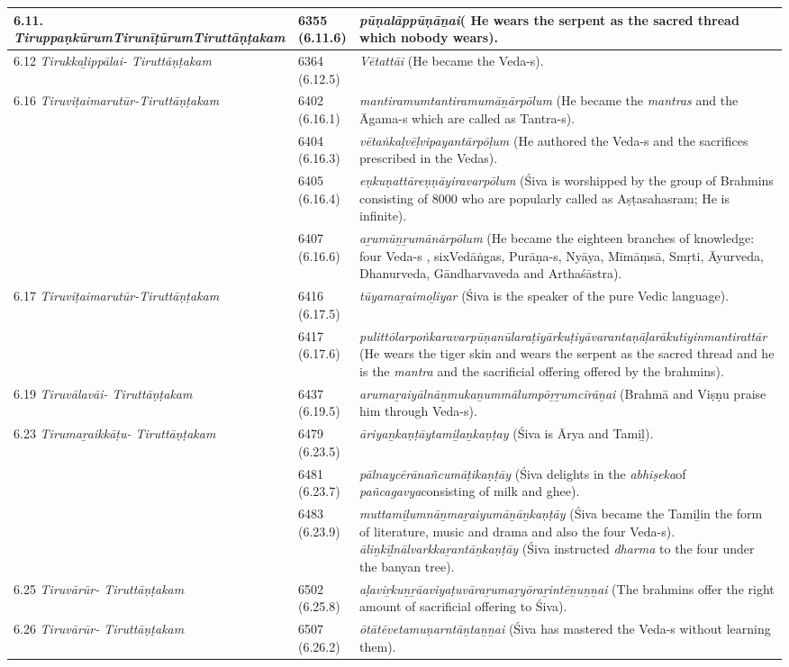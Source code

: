 \begin{longtable}{|m{2.7cm}|m{2.7cm}|>{\raggedright}m{3.1cm}|}
\hline
6.11. \textit{Tiruppaṇkūrum\-Tirunīṭūrum\-Tiruttāṇṭakam} & 6355 (6.11.6) & \textit{pūṇalāppūṇāṉai}( He wears the serpent as the sacred thread which nobody wears). \tabularnewline
\hline
6.12 \textit{Tirukkaḻippālai- Tiruttāṇṭakam} & 6364 (6.12.5) & \textit{Vētattāi} (He became the Veda-s). \tabularnewline
\hline
6.16 \textit{Tiruviṭaimarutūr-Tiruttāṇṭakam} & 6402 (6.16.1) & \textit{mantiramumtantira\-mumāṉārpōlum}  (He became the \textit{mantras }and the Āgama-s which are called as Tantra-s). \tabularnewline
\hline
 & 6404 (6.16.3) & \textit{vētaṅkaḷvēḷvipayantār\-pōḷum} (He authored the Veda-s and the sacrifices prescribed in the Vedas). \tabularnewline
\hline
 & 6405 (6.16.4) & \textit{eṇkuṇattāreṇṇāyiravar\-pōlum} (Śiva is worshipped by the group of Brahmins consisting of 8000 who are popularly called as Aṣṭasahasram; He is infinite). \tabularnewline
\hline
 & 6407 (6.16.6) & \textit{aṟumūṉṟumānārpōlum} (He became the eighteen branches of knowledge: four Veda-s , sixVedāṅgas, Purāṇa-s, Nyāya, Mīmāṃsā, Smṛti, Āyurveda, Dhanurveda, Gāndharvaveda and Arthaśāstra). \tabularnewline
\hline
6.17 \textit{Tiruviṭaimarutūr-Tiruttāṇṭakam} & 6416 (6.17.5) & \textit{tūyamaṟaimoḻiyar} (Śiva is the speaker of the pure Vedic language). \tabularnewline
\hline
 & 6417 (6.17.6) & \textit{pulittōlarpoṅkaravar\-pūṇanūlaraṭiyārkuṭi\-yāvarantaṇāḷarākuti\-yinmantirattār} (He wears the tiger skin and wears the serpent as the sacred thread and  he is the \textit{mantra} and the sacrificial offering offered by the brahmins). \tabularnewline
\hline
6.19 \textit{Tiruvālavāi- Tiruttāṇṭakam} & 6437 (6.19.5) & \textit{arumaṟaiyālnāṉmuka\-ṉummālumpōṟṟumcī\-rāṉai} (Brahmā and Viṣṇu praise him through Veda-s). \tabularnewline
\hline
6.23 \textit{Tirumaṟaikkāṭu- Tiruttāṇṭakam} & 6479 (6.23.5) & \textit{āriyaṉkaṇṭāytamiḻaṉ\-kaṇṭay} (Śiva is Ārya and Tamiḻ). \tabularnewline
\hline
 & 6481 (6.23.7) & \textit{pālnaycērānañcumāṭi\-kaṇṭāy} (Śiva delights in the \textit{abhiṣeka}of \textit{pañcagavya}consisting of milk and ghee). \tabularnewline
\hline
 & 6483 (6.23.9) & \textit{muttamiḻumnāṉmaṟai\-yumāṉāṉkaṇṭāy} (Śiva became the Tamiḻin the form of literature, music and drama and also the four Veda-s). \textit{āliṉkīḻnālvarkkaṟantāṉkaṇṭāy} (Śiva instructed \textit{dharma} to the four under the banyan tree). \tabularnewline
\hline
6.25 \textit{Tiruvārūr- Tiruttāṇṭakam} & 6502 (6.25.8) & \textit{aḷaviṟkuṉṟāaviyaṭuvā\-raṟumaṟyōraṟintēṉu\-ṉṉai} (The brahmins offer the right amount of sacrificial offering to Śiva). \tabularnewline
\hline
6.26 \textit{Tiruvārūr- Tiruttāṇṭakam} & 6507 (6.26.2) & \textit{ōtātēvetamuṇarntāṉta\-ṉṉai} (Śiva has mastered the Veda-s without learning them). \tabularnewline

\end{longtable}
